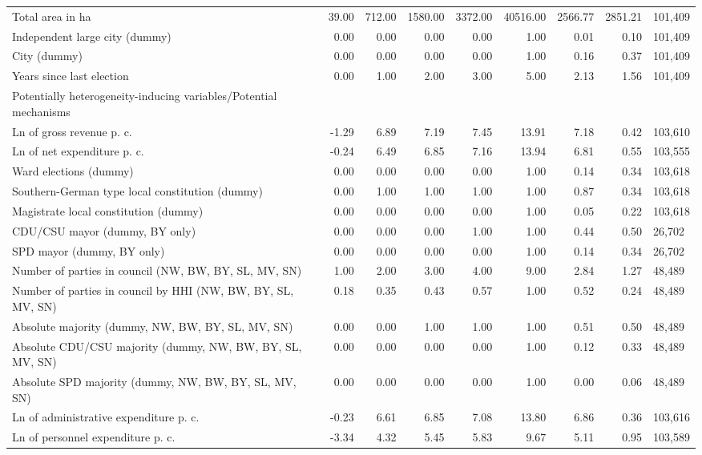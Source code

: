 \begin{tabular}{lrrrrrrrl}
  Total area in ha & 39.00 & 712.00 & 1580.00 & 3372.00 & 40516.00 & 2566.77 & 2851.21 & 101,409 \\ 
  Independent large city (dummy) & 0.00 & 0.00 & 0.00 & 0.00 & 1.00 & 0.01 & 0.10 & 101,409 \\ 
  City (dummy) & 0.00 & 0.00 & 0.00 & 0.00 & 1.00 & 0.16 & 0.37 & 101,409 \\ 
  Years since last election & 0.00 & 1.00 & 2.00 & 3.00 & 5.00 & 2.13 & 1.56 & 101,409 \\ 
  Potentially heterogeneity-inducing variables/Potential mechanisms &  &  &  &  &  &  &  &  \\ 
  Ln of gross revenue p. c. & -1.29 & 6.89 & 7.19 & 7.45 & 13.91 & 7.18 & 0.42 & 103,610 \\ 
  Ln of net expenditure p. c. & -0.24 & 6.49 & 6.85 & 7.16 & 13.94 & 6.81 & 0.55 & 103,555 \\ 
  Ward elections (dummy) & 0.00 & 0.00 & 0.00 & 0.00 & 1.00 & 0.14 & 0.34 & 103,618 \\ 
  Southern-German type local constitution (dummy) & 0.00 & 1.00 & 1.00 & 1.00 & 1.00 & 0.87 & 0.34 & 103,618 \\ 
  Magistrate local constitution (dummy) & 0.00 & 0.00 & 0.00 & 0.00 & 1.00 & 0.05 & 0.22 & 103,618 \\ 
  CDU/CSU mayor (dummy, BY only) & 0.00 & 0.00 & 0.00 & 1.00 & 1.00 & 0.44 & 0.50 & 26,702 \\ 
  SPD mayor (dummy, BY only) & 0.00 & 0.00 & 0.00 & 0.00 & 1.00 & 0.14 & 0.34 & 26,702 \\ 
  Number of parties in council (NW, BW, BY, SL, MV, SN) & 1.00 & 2.00 & 3.00 & 4.00 & 9.00 & 2.84 & 1.27 & 48,489 \\ 
  Number of parties in council by HHI (NW, BW, BY, SL, MV, SN) & 0.18 & 0.35 & 0.43 & 0.57 & 1.00 & 0.52 & 0.24 & 48,489 \\ 
  Absolute majority (dummy, NW, BW, BY, SL, MV, SN) & 0.00 & 0.00 & 1.00 & 1.00 & 1.00 & 0.51 & 0.50 & 48,489 \\ 
  Absolute CDU/CSU majority (dummy, NW, BW, BY, SL, MV, SN) & 0.00 & 0.00 & 0.00 & 0.00 & 1.00 & 0.12 & 0.33 & 48,489 \\ 
  Absolute SPD majority (dummy, NW, BW, BY, SL, MV, SN) & 0.00 & 0.00 & 0.00 & 0.00 & 1.00 & 0.00 & 0.06 & 48,489 \\ 
  Ln of administrative expenditure p. c. & -0.23 & 6.61 & 6.85 & 7.08 & 13.80 & 6.86 & 0.36 & 103,616 \\ 
  Ln of personnel expenditure p. c. & -3.34 & 4.32 & 5.45 & 5.83 & 9.67 & 5.11 & 0.95 & 103,589 \\ 

\end{tabular}
